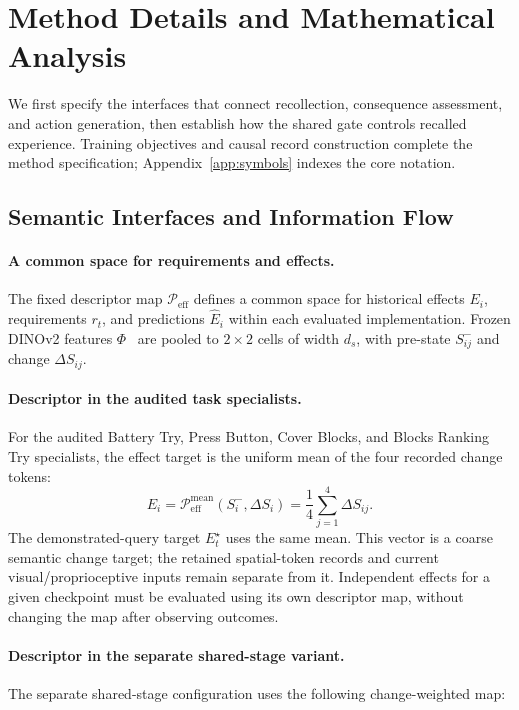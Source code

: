 \section{Method Details and Mathematical Analysis}
\label{app:contracts}
\label{app:notation}

We first specify the interfaces that connect recollection, consequence assessment, and action generation, then establish how the shared gate controls recalled experience.
Training objectives and causal record construction complete the method specification; Appendix~\ref{app:symbols} indexes the core notation.

\subsection{Semantic Interfaces and Information Flow}
\label{app:effect_repr}

\paragraph{A common space for requirements and effects.}
The fixed descriptor map $\mathcal P_{\mathrm{eff}}$ defines a common space for historical effects $E_i$, requirements $r_t$, and predictions $\widehat E_i$ within each evaluated implementation.
Frozen DINOv2 features $\Phi$~\citep{oquab2024dinov2} are pooled to $2\times2$ cells of width $d_s$, with pre-state $S^-_{ij}$ and change $\Delta S_{ij}$.

\paragraph{Descriptor in the audited task specialists.}
\label{app:original_effect_projection}
For the audited Battery Try, Press Button, Cover Blocks, and Blocks Ranking Try specialists, the effect target is the uniform mean of the four recorded change tokens:
\[
 E_i=\mathcal P_{\mathrm{eff}}^{\mathrm{mean}}(S_i^-,\Delta S_i)
 =\frac14\sum_{j=1}^{4}\Delta S_{ij}.
\]
The demonstrated-query target $E_t^\star$ uses the same mean.
This vector is a coarse semantic change target; the retained spatial-token records and current visual/proprioceptive inputs remain separate from it.
Independent effects for a given checkpoint must be evaluated using its own descriptor map, without changing the map after observing outcomes.

\paragraph{Descriptor in the separate shared-stage variant.}
The separate shared-stage configuration uses the following change-weighted map:

